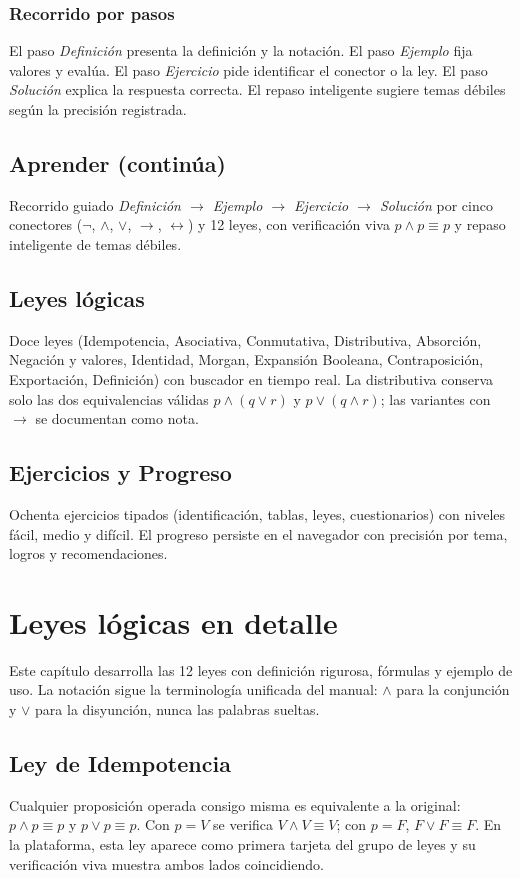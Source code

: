 \documentclass[11pt,a4paper,openany]{book}
\begin{document}
\subsection{Recorrido por pasos}
El paso \textit{Definici\'on} presenta la definici\'on y la notaci\'on. El paso \textit{Ejemplo} fija valores y eval\'ua. El paso \textit{Ejercicio} pide identificar el conector o la ley. El paso \textit{Soluci\'on} explica la respuesta correcta. El repaso inteligente sugiere temas d\'ebiles seg\'un la precisi\'on registrada.
\section{Aprender (contin\'ua)}
Recorrido guiado \textit{Definici\'on $\to$ Ejemplo $\to$ Ejercicio $\to$ Soluci\'on} por cinco conectores ($\lnot$, $\land$, $\lor$, $\to$, $\leftrightarrow$) y 12 leyes, con verificaci\'on viva $p \land p \equiv p$ y repaso inteligente de temas d\'ebiles.

\section{Leyes l\'ogicas}
Doce leyes (Idempotencia, Asociativa, Conmutativa, Distributiva, Absorci\'on, Negaci\'on y valores, Identidad, Morgan, Expansi\'on Booleana, Contraposici\'on, Exportaci\'on, Definici\'on) con buscador en tiempo real. La distributiva conserva solo las dos equivalencias v\'alidas $p \land (q \lor r)$ y $p \lor (q \land r)$; las variantes con $\to$ se documentan como nota.

\section{Ejercicios y Progreso}
Ochenta ejercicios tipados (identificaci\'on, tablas, leyes, cuestionarios) con niveles f\'acil, medio y dif\'icil. El progreso persiste en el navegador con precisi\'on por tema, logros y recomendaciones.

\chapter{Leyes l\'ogicas en detalle}
\label{ch:leyes-detalle}
Este cap\'itulo desarrolla las 12 leyes con definici\'on rigurosa, f\'ormulas y ejemplo de uso. La notaci\'on sigue la terminolog\'ia unificada del manual: $\land$ para la conjunci\'on y $\lor$ para la disyunci\'on, nunca las palabras sueltas.

\section{Ley de Idempotencia}
Cualquier proposici\'on operada consigo misma es equivalente a la original: $p \land p \equiv p$ y $p \lor p \equiv p$. Con $p = V$ se verifica $V \land V \equiv V$; con $p = F$, $F \lor F \equiv F$. En la plataforma, esta ley aparece como primera tarjeta del grupo de leyes y su verificaci\'on viva muestra ambos lados coincidiendo.
\end{document}
